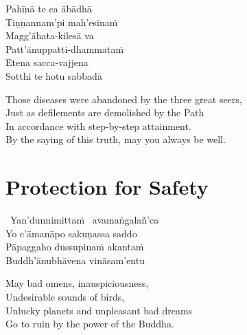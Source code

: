 \ifbfive\clearpage\fi

\begin{pali-hang-continued}
  Pahīnā te ca ābādhā\\
  Tiṇṇannam'pi mah'esinaṁ\\
  Magg'āhata-kilesā va\\
  Patt'ānuppatti-dhammataṁ\\
  Etena sacca-vajjena\\
  Sotthi te hotu sabbadā
\end{pali-hang-continued}

\begin{english-verses}
  Those diseases were abandoned by the three great seers,\\
  Just as defilements are demolished by the Path\\
  In accordance with step-by-step attainment.\\
  By the saying of this truth, may you always be well.
\end{english-verses}

\ifninebythirteen\enlargethispage{1\baselineskip}\fi

\suttaRef{[Thai]}



\section{Protection for Safety}
\label{protection-for-safety}

\begin{pali-hang-together}
  \anglebracketleft\ \hspace{-0.5mm}Yan'dunnimittaṁ \hspace{-0.5mm}\anglebracketright\ avamaṅgalañ'ca\\
  Yo c'āmanāpo sakuṇassa saddo\\
  Pāpaggaho dussupinaṁ akantaṁ\\
  Buddh'ānubhāvena vināsam'entu
\end{pali-hang-together}

\begin{english-verses}
  May bad omens, inauspiciousness,\\
  Undesirable sounds of birds,\\
  Unlucky planets and unpleasant bad dreams\\
  Go to ruin by the power of the Buddha.
\end{english-verses}


